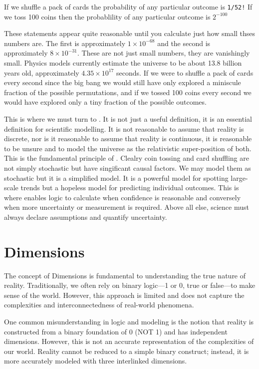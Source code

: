 \documentclass[12pt]{article}
\begin{document}
If we shuffle a pack of cards the probability of any particular outcome is \texttt{1/52!}
If we toss 100 coins then the probablility of any particular outcome is $2^{-100}$

These statements appear quite reasonable until you calculate just how small thses numbers are. The first is approximately $1 \times 10^{-68}$ and the second is approximately $8 \times 10^{-31}$. These are not just small numbers, they are vanishingly small. Physics models currently estimate the universe to be about 13.8 billion years old, approximately $4.35 \times 10^{17}$ seconds. If we were to shuffle a pack of cards every second since the big bang we would still have only explored a miniscule fraction of the possible permutations, and if we tossed 100 coins every second we would have explored only a tiny fraction of the possible outcomes.

This is where we must turn to \qbit{}. It is not just a useful definition, it is an essential definition for scientific modelling. It is not reasonable to assume that reality is discrete, nor is it reasonable to assume that reality is continuous, it is reasonable to be unsure and to model the universe as the relativistic super-position of both. This is the fundamental principle of \iR{}. Clealry coin tossing and card shuffling are not simply stochastic but have singificant causal factors. We may model them as stochastic but it is a simplified model. It is a powerful model for spotting large-scale trends but a hopeless model for predicting individual outcomes. This is where \qbit{} enables logic to calculate when confidence is reasonable and conversely when more uncertainty or measurement is required. Above all else, science must always declare assumptions and quantify uncertainty.

\section*{\iR{} Dimensions}

The concept of \iR{} Dimensions is fundamental to understanding the true nature of reality. Traditionally, we often rely on binary logic—1 or 0, true or false—to make sense of the world. However, this approach is limited and does not capture the complexities and interconnectedness of real-world phenomena.

One common misunderstanding in logic and modeling is the notion that reality is constructed from a binary foundation of 0 (NOT 1) and has independent dimensions. However, this is not an accurate representation of the complexities of our world. Reality cannot be reduced to a simple binary construct; instead, it is more accurately modeled with three interlinked dimensions.
\end{document}
